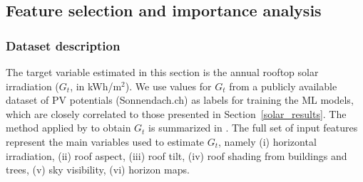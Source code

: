 
\subsection{Feature selection and importance analysis}
\label{chile_ftrSelect}

\subsubsection{Dataset description}

The target variable estimated in this section is the annual rooftop solar irradiation ($G_t$, in kWh/m$^2$). We use values for $G_t$ from a publicly available dataset of PV potentials (Sonnendach.ch) \cite{klauser_solarpotentialanalyse_2016} as labels for training the ML models, which are closely correlated to those presented in Section~\ref{solar_results}. The method applied by \citet{klauser_solarpotentialanalyse_2016} to obtain $G_t$ is summarized in \cite{walch_fast_2019}. 
The full set of input features represent the main variables used to estimate $G_t$, namely
(i) horizontal irradiation, (ii) roof aspect, (iii) roof tilt, (iv) roof shading from buildings and trees, (v) sky visibility, (vi) horizon maps. 

